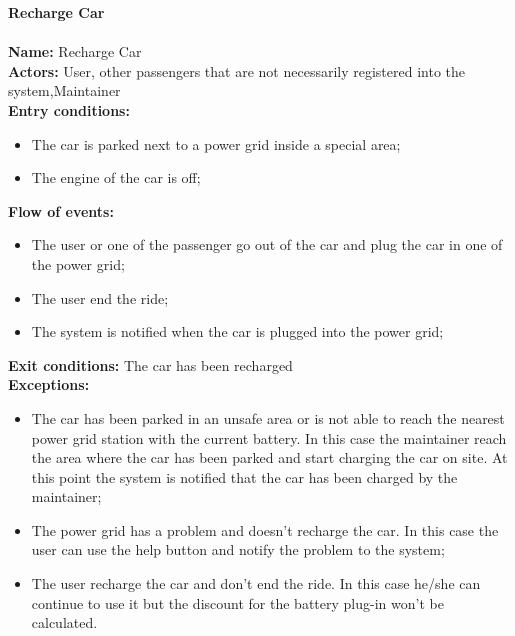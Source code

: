 \textbf{Recharge Car}\\
\\
\textbf{Name:} Recharge Car\\
\textbf{Actors:} User, other passengers that are not necessarily registered into the system,Maintainer\\
\textbf{Entry conditions:}
\begin{itemize}
\item The car is parked next to a power grid inside a special area;
\item The engine of the car is off;
\end{itemize}
\textbf{Flow of events:}
\begin{itemize}
\item The user or one of the passenger go out of the car and plug the car in one of the power grid;
\item The user end the ride;
\item The system is notified when the car is plugged into the power grid;
\end{itemize}
\textbf{Exit conditions:} The car has been recharged \\
\textbf{Exceptions:}
\begin{itemize}
\item The car has been parked in an unsafe area or is not able to reach the nearest power grid station with the current battery. In this case the maintainer reach the area where the car has been parked and start charging the car on site. At this point the system is notified that the car has been charged by the maintainer;
\item The power grid has  a problem and doesn't recharge the car. In this case the user can use the help button and notify the problem to the system;
\item The user recharge the car and don't end the ride. In this case he/she can continue to use it but the discount for the battery plug-in won't be calculated.
\end{itemize}

